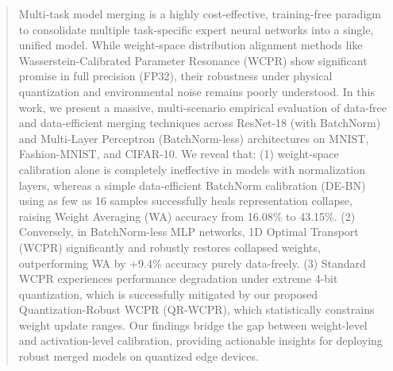 \documentclass{article}
\theoremstyle{plain}
\theoremstyle{definition}
\theoremstyle{remark}
\begin{document}

\printAffiliationsAndNotice{\icmlequalcontrib}

\begin{abstract}
Multi-task model merging is a highly cost-effective, training-free paradigm to consolidate multiple task-specific expert neural networks into a single, unified model. While weight-space distribution alignment methods like Wasserstein-Calibrated Parameter Resonance (WCPR) show significant promise in full precision (FP32), their robustness under physical quantization and environmental noise remains poorly understood. In this work, we present a massive, multi-scenario empirical evaluation of data-free and data-efficient merging techniques across ResNet-18 (with BatchNorm) and Multi-Layer Perceptron (BatchNorm-less) architectures on MNIST, Fashion-MNIST, and CIFAR-10. We reveal that: (1) weight-space calibration alone is completely ineffective in models with normalization layers, whereas a simple data-efficient BatchNorm calibration (DE-BN) using as few as 16 samples successfully heals representation collapse, raising Weight Averaging (WA) accuracy from 16.08\% to 43.15\%. (2) Conversely, in BatchNorm-less MLP networks, 1D Optimal Transport (WCPR) significantly and robustly restores collapsed weights, outperforming WA by +9.4\% accuracy purely data-freely. (3) Standard WCPR experiences performance degradation under extreme 4-bit quantization, which is successfully mitigated by our proposed Quantization-Robust WCPR (QR-WCPR), which statistically constrains weight update ranges. Our findings bridge the gap between weight-level and activation-level calibration, providing actionable insights for deploying robust merged models on quantized edge devices.
\end{abstract}
\end{document}
